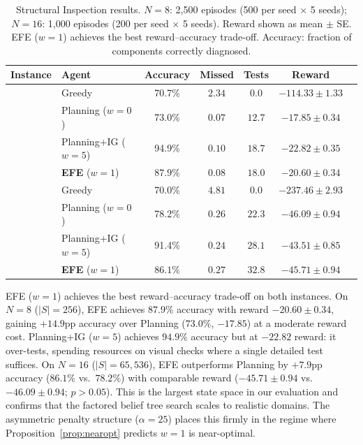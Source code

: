 \documentclass[runningheads]{llncs}
\begin{document}
\begin{table}[ht]
\centering
\caption{Structural Inspection results. $N{=}8$: 2{,}500 episodes (500 per seed $\times$ 5 seeds); $N{=}16$: 1{,}000 episodes (200 per seed $\times$ 5 seeds). Reward shown as mean $\pm$ SE. EFE ($w{=}1$) achieves the best reward--accuracy trade-off. Accuracy: fraction of components correctly diagnosed.}
\label{tab:inspection}
\begin{small}
\begin{tabular}{llccccc}
\toprule
Instance & Agent & Accuracy & Missed & Tests & Reward \\
\midrule
{} & Greedy & 70.7\% & $2.34$ & $0.0$ & $-114.33 \pm 1.33$ \\
& Planning ($w{=}0$) & 73.0\% & $0.07$ & $12.7$ & $-17.85 \pm 0.34$ \\
& Planning+IG ($w{=}5$) & 94.9\% & $0.10$ & $18.7$ & $-22.82 \pm 0.35$ \\
& \textbf{EFE} ($w{=}1$) & $\mathbf{87.9\%}$ & $\mathbf{0.08}$ & $18.0$ & $\mathbf{-20.60 \pm 0.34}$ \\
\midrule
{} & Greedy & 70.0\% & $4.81$ & $0.0$ & $-237.46 \pm 2.93$ \\
& Planning ($w{=}0$) & 78.2\% & $0.26$ & $22.3$ & $-46.09 \pm 0.94$ \\
& Planning+IG ($w{=}5$) & 91.4\% & $0.24$ & $28.1$ & $-43.51 \pm 0.85$ \\
& \textbf{EFE} ($w{=}1$) & $\mathbf{86.1\%}$ & $\mathbf{0.27}$ & $32.8$ & $\mathbf{-45.71 \pm 0.94}$ \\
\bottomrule
\end{tabular}
\end{small}
\end{table}

EFE ($w{=}1$) achieves the best reward--accuracy trade-off on both instances. On $N{=}8$ ($|S|{=}256$), EFE achieves $87.9\%$ accuracy with reward $-20.60 \pm 0.34$, gaining $+14.9$pp accuracy over Planning ($73.0\%$, $-17.85$) at a moderate reward cost. Planning+IG ($w{=}5$) achieves $94.9\%$ accuracy but at $-22.82$ reward: it over-tests, spending resources on visual checks where a single detailed test suffices. On $N{=}16$ ($|S|{=}65{,}536$), EFE outperforms Planning by $+7.9$pp accuracy ($86.1\%$ vs.\ $78.2\%$) with comparable reward ($-45.71 \pm 0.94$ vs.\ $-46.09 \pm 0.94$; $p > 0.05$). This is the largest state space in our evaluation and confirms that the factored belief tree search scales to realistic domains. The asymmetric penalty structure ($\alpha = 25$) places this firmly in the regime where Proposition~\ref{prop:nearopt} predicts $w{=}1$ is near-optimal.
\end{document}
